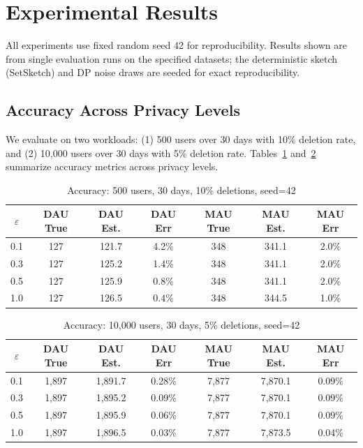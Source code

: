 \documentclass[11pt]{article}
\begin{document}
\section{Experimental Results}

All experiments use fixed random seed 42 for reproducibility. Results shown are from single evaluation runs on the specified datasets; the deterministic sketch (SetSketch) and DP noise draws are seeded for exact reproducibility.

\subsection{Accuracy Across Privacy Levels}

We evaluate on two workloads: (1) 500 users over 30 days with 10\% deletion rate, and (2) 10,000 users over 30 days with 5\% deletion rate. Tables~\ref{tab:results500} and~\ref{tab:results10k} summarize accuracy metrics across privacy levels.

\begin{table}[H]
\centering
\caption{Accuracy: 500 users, 30 days, 10\% deletions, seed=42}
\label{tab:results500}
\begin{tabular}{@{}ccccccc@{}}
\toprule
\textbf{$\varepsilon$} & \textbf{DAU True} & \textbf{DAU Est.} & \textbf{DAU Err} & \textbf{MAU True} & \textbf{MAU Est.} & \textbf{MAU Err} \\
\midrule
0.1 & 127 & 121.7 & 4.2\% & 348 & 341.1 & 2.0\% \\
0.3 & 127 & 125.2 & 1.4\% & 348 & 341.1 & 2.0\% \\
0.5 & 127 & 125.9 & 0.8\% & 348 & 341.1 & 2.0\% \\
1.0 & 127 & 126.5 & 0.4\% & 348 & 344.5 & 1.0\% \\
\bottomrule
\end{tabular}
\end{table}

\begin{table}[H]
\centering
\caption{Accuracy: 10,000 users, 30 days, 5\% deletions, seed=42}
\label{tab:results10k}
\begin{tabular}{@{}ccccccc@{}}
\toprule
\textbf{$\varepsilon$} & \textbf{DAU True} & \textbf{DAU Est.} & \textbf{DAU Err} & \textbf{MAU True} & \textbf{MAU Est.} & \textbf{MAU Err} \\
\midrule
0.1 & 1,897 & 1,891.7 & 0.28\% & 7,877 & 7,870.1 & 0.09\% \\
0.3 & 1,897 & 1,895.2 & 0.09\% & 7,877 & 7,870.1 & 0.09\% \\
0.5 & 1,897 & 1,895.9 & 0.06\% & 7,877 & 7,870.1 & 0.09\% \\
1.0 & 1,897 & 1,896.5 & 0.03\% & 7,877 & 7,873.5 & 0.04\% \\
\bottomrule
\end{tabular}
\end{table}
\end{document}
